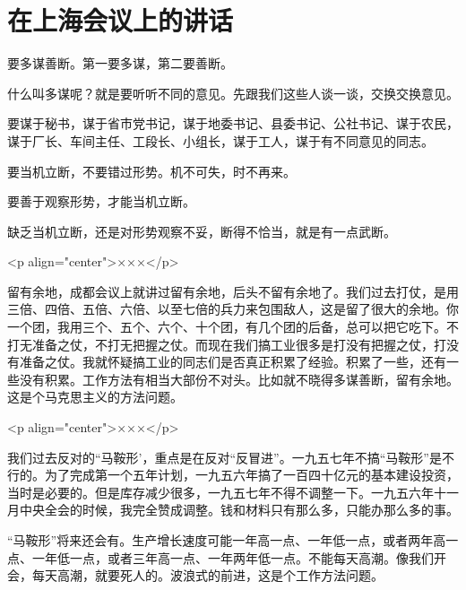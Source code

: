 \section[在上海会议上的讲话（一九五九年四月五日）]{在上海会议上的讲话}


要多谋善断。第一要多谋，第二要善断。

什么叫多谋呢？就是要听听不同的意见。先跟我们这些人谈一谈，交换交换意见。

要谋于秘书，谋于省市党书记，谋于地委书记、县委书记、公社书记、谋于农民，谋于厂长、车间主任、工段长、小组长，谋于工人，谋于有不同意见的同志。

要当机立断，不要错过形势。机不可失，时不再来。

要善于观察形势，才能当机立断。

缺乏当机立断，还是对形势观察不妥，断得不恰当，就是有一点武断。

<p align="center">×××</p>

留有余地，成都会议上就讲过留有余地，后头不留有余地了。我们过去打仗，是用三倍、四倍、五倍、六倍、以至七倍的兵力来包围敌人，这是留了很大的余地。你一个团，我用三个、五个、六个、十个团，有几个团的后备，总可以把它吃下。不打无准备之仗，不打无把握之仗。而现在我们搞工业很多是打没有把握之仗，打没有准备之仗。我就怀疑搞工业的同志们是否真正积累了经验。积累了一些，还有一些没有积累。工作方法有相当大部份不对头。比如就不晓得多谋善断，留有余地。这是个马克思主义的方法问题。

<p align="center">×××</p>

我们过去反对的“马鞍形’，重点是在反对“反冒进”。一九五七年不搞“马鞍形”是不行的。为了完成第一个五年计划，一九五六年搞了一百四十亿元的基本建设投资，当时是必要的。但是库存减少很多，一九五七年不得不调整一下。一九五六年十一月中央全会的时候，我完全赞成调整。钱和材料只有那么多，只能办那么多的事。

“马鞍形”将来还会有。生产增长速度可能一年高一点、一年低一点，或者两年高一点、一年低一点，或者三年高一点、一年两年低一点。不能每天高潮。像我们开会，每天高潮，就要死人的。波浪式的前进，这是个工作方法问题。


